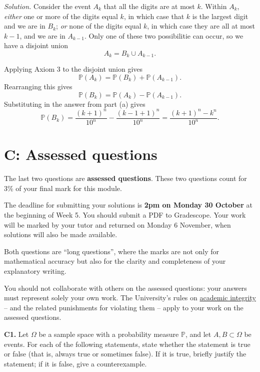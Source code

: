 \documentclass[
  a4paper,
]{book}
\theoremstyle{definition}
\theoremstyle{definition}
\theoremstyle{definition}
\theoremstyle{definition}
\theoremstyle{remark}
\begin{document}
\begin{myanswers}
\emph{Solution.}
Consider the event \(A_k\) that all the digits are at most \(k\). Within \(A_k\), \emph{either} one or more of the digits equal \(k\), in which case that \(k\) is the largest digit and we are in \(B_k\); \emph{or} none of the digits equal \(k\), in which case they are all at most \(k-1\), and we are in \(A_{k-1}\). Only one of these two possibilitie can occur, so we have a disjoint union
\[ A_k = B_k \cup A_{k-1} . \]

Applying Axiom 3 to the disjoint union gives
\[ \mathbb P(A_k) = \mathbb P(B_k) + \mathbb P(A_{k-1}) . \]
Rearranging this gives
\[ \mathbb P(B_k) = \mathbb P(A_k) - \mathbb P(A_{k-1}) . \]
Substituting in the answer from part (a) gives
\[\mathbb P(B_k) = \frac{(k+1)^n}{10^n} - \frac{(k-1+1)^n}{10^n} = \frac{(k+1)^n - k^n}{10^n} . \]

\end{myanswers}

\hypertarget{P2-assessed}{%
\section*{C: Assessed questions}\label{P2-assessed}}

The last two questions are \textbf{assessed questions}. These two questions count for 3\% of your final mark for this module.

The deadline for submitting your solutions is \textbf{2pm on Monday 30 October} at the beginning of Week 5. You should submit a PDF to Gradescope.
Your work will be marked by your tutor and returned on Monday 6 November, when solutions will also be made available.

Both questions are ``long questions'', where the marks are not only for mathematical accuracy but also for the clarity and completeness of your explanatory writing.

You should not collaborate with others on the assessed questions: your answers must represent solely your own work. The University's rules on \href{https://library.leeds.ac.uk/info/1401/academic_skills/46/academic_integrity_and_plagiarism}{academic integrity} -- and the related punishments for violating them -- apply to your work on the assessed questions.

\textbf{C1.} Let \(\Omega\) be a sample space with a probability measure \(\mathbb P\), and let \(A, B \subset \Omega\) be events. For each of the following statements, state whether the statement is true or false (that is, always true or sometimes false). If it is true, briefly justify the statement; if it is false, give a counterexample.
\end{document}
